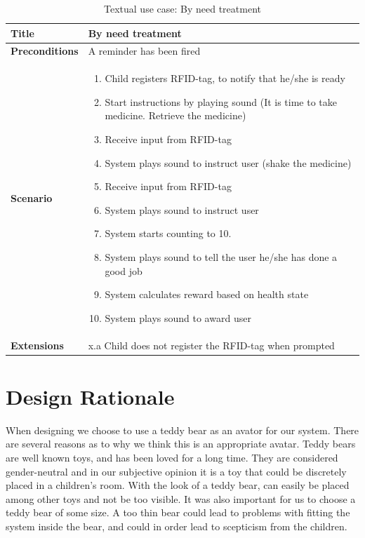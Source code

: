 \begin{table}[H]
\begin{tabular}{|p{4.0cm} | p{9.0cm} |}
\hline
\textbf{Title} & By need treatment \\
\hline
\textbf{Preconditions} & A reminder has been fired \\
\hline 
\textbf{Scenario} & 
	\begin{enumerate}
	  \item Child registers RFID-tag, to notify that he/she is ready
	  \item Start instructions by playing sound (It is time to take medicine. Retrieve the medicine)
	  \item Receive input from RFID-tag
	  \item System plays sound to instruct user (shake the medicine)
	  \item Receive input from RFID-tag
	  \item System plays sound to instruct user
	  \item System starts counting to 10. 
	  \item System plays sound to tell the user he/she has done a good job
	  \item System calculates reward based on health state
	  \item System plays sound to award user
	\end{enumerate}
\\
\hline
	\textbf{Extensions} & 
		x.a Child does not register the RFID-tag when prompted
\\
\hline
\end{tabular}
\caption{Textual use case: By need treatment}
\label{tab:textual-use-case}
\end{table} 



\section{Design Rationale}
When designing \buddy{} we choose to use a teddy bear as an avator for our system. There are several reasons as to why we think this is an appropriate avatar. Teddy bears are well known toys, and has been loved for a long time. They are considered gender-neutral \cite{stagnitti1997determining} \cite{cherney2006gender} and in our subjective opinion it is a toy that could be discretely placed in a children's room. With the look of a teddy bear, \buddy{} can easily be placed among other toys and not be too visible. It was also important for us to choose a teddy bear of some size. A too thin bear could lead to problems with fitting the system inside the bear, and could in order lead to scepticism from the children. 

